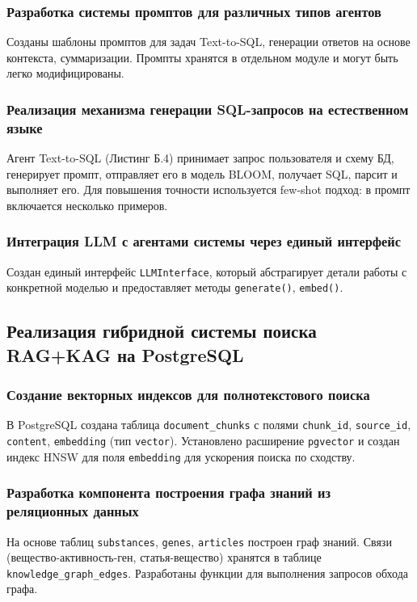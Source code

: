 \documentclass[a4paper,14pt]{extarticle}
\begin{document}
	\subsubsection{Разработка системы промптов для различных типов агентов}
	Созданы шаблоны промптов для задач Text-to-SQL, генерации ответов на основе контекста, суммаризации. Промпты хранятся в отдельном модуле и могут быть легко модифицированы.
	
	\subsubsection{Реализация механизма генерации SQL-запросов на естественном языке}
	Агент Text-to-SQL (Листинг Б.4) принимает запрос пользователя и схему БД, генерирует промпт, отправляет его в модель BLOOM, получает SQL, парсит и выполняет его. Для повышения точности используется few-shot подход: в промпт включается несколько примеров.
	
	\subsubsection{Интеграция LLM с агентами системы через единый интерфейс}
	Создан единый интерфейс \texttt{LLMInterface}, который абстрагирует детали работы с конкретной моделью и предоставляет методы \texttt{generate()}, \texttt{embed()}.
	
	\subsection{Реализация гибридной системы поиска RAG+KAG на PostgreSQL}
	
	\subsubsection{Создание векторных индексов для полнотекстового поиска}
	В PostgreSQL создана таблица \texttt{document\_chunks} с полями \texttt{chunk\_id}, \texttt{source\_id}, \texttt{content}, \texttt{embedding} (тип \texttt{vector}). Установлено расширение \texttt{pgvector} и создан индекс HNSW для поля \texttt{embedding} для ускорения поиска по сходству.
	
	\subsubsection{Разработка компонента построения графа знаний из реляционных данных}
	На основе таблиц \texttt{substances}, \texttt{genes}, \texttt{articles} построен граф знаний. Связи (вещество-активность-ген, статья-вещество) хранятся в таблице \texttt{knowledge\_graph\_edges}. Разработаны функции для выполнения запросов обхода графа.
	
\end{document}
